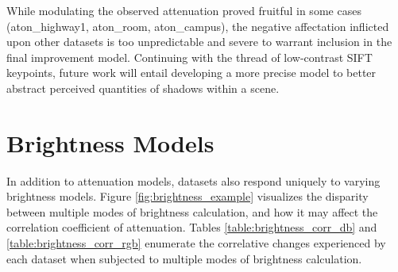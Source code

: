 \documentclass[12pt]{report}
\begin{document}
While modulating the observed attenuation proved fruitful in some cases (aton\_highway1, aton\_room, aton\_campus), the negative affectation inflicted upon other datasets is too unpredictable and severe to warrant inclusion in the final improvement model. Continuing with the thread of low-contrast SIFT keypoints, future work will entail developing a more precise model to better abstract perceived quantities of shadows within a scene.

\section{Brightness Models} \label{section:brightness_models}

In addition to attenuation models, datasets also respond uniquely to varying brightness models. Figure \ref{fig:brightness_example} visualizes the disparity between multiple modes of brightness calculation, and how it may affect the correlation coefficient of attenuation. Tables \ref{table:brightness_corr_db} and \ref{table:brightness_corr_rgb} enumerate the correlative changes experienced by each dataset when subjected to multiple modes of brightness calculation.
\end{document}
